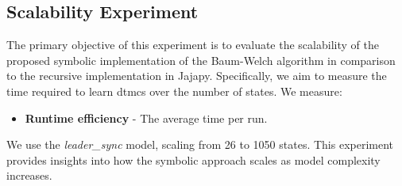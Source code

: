 \subsection{Scalability Experiment}
The primary objective of this experiment is to evaluate the scalability of the proposed symbolic implementation of the Baum-Welch algorithm in comparison to the recursive implementation in Jajapy.
Specifically, we aim to measure the time required to learn \glspl{dtmc} over the number of states.
We measure:
\begin{itemize}
    \item \textbf{Runtime efficiency} - The average time per run.
\end{itemize}

We use the \textit{leader\_sync} model, scaling from 26 to 1050 states.
This experiment provides insights into how the symbolic approach scales as model complexity increases.






